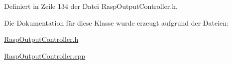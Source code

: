 Definiert in Zeile 134 der Datei Rasp\+Output\+Controller.\+h.



Die Dokumentation für diese Klasse wurde erzeugt aufgrund der Dateien\+:\begin{DoxyCompactItemize}
\item 
\hyperlink{_rasp_output_controller_8h}{Rasp\+Output\+Controller.\+h}\item 
\hyperlink{_rasp_output_controller_8cpp}{Rasp\+Output\+Controller.\+cpp}\end{DoxyCompactItemize}
